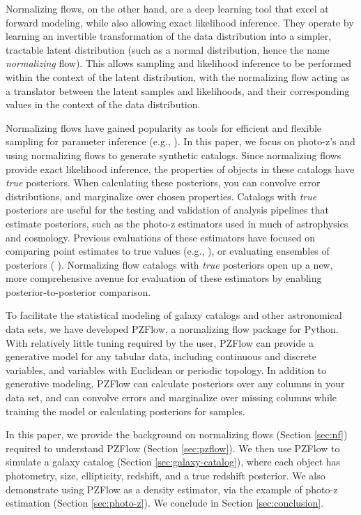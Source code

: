 \documentclass[twocolumn,twocolappendix]{aastex631}
\newcommand{\citePZp}{(\citetalias{schmidt2020} \citeyear{schmidt2020})\xspace}
\begin{document}
Normalizing flows, on the other hand, are a deep learning tool that excel at forward modeling, while also allowing exact likelihood inference.
They operate by learning an invertible transformation of the data distribution into a simpler, tractable latent distribution (such as a normal distribution, hence the name \emph{normalizing} flow).
This allows sampling and likelihood inference to be performed within the context of the latent distribution, with the normalizing flow acting as a translator between the latent samples and likelihoods, and their corresponding values in the context of the data distribution.

Normalizing flows have gained popularity as tools for efficient and flexible sampling for parameter inference (e.g., \citealt{dai2022,dacunha2022,hassan2022}).
In this paper, we focus on photo-z's and using normalizing flows to generate synthetic catalogs.
Since normalizing flows provide exact likelihood inference, the properties of objects in these catalogs have \emph{true} posteriors.
When calculating these posteriors, you can convolve error distributions, and marginalize over chosen properties.
Catalogs with \emph{true} posteriors are useful for the testing and validation of analysis pipelines that estimate posteriors, such as the photo-z estimators used in much of astrophysics and cosmology.
Previous evaluations of these estimators have focused on comparing point estimates to true values (e.g., \citealt{hildebrandt2010,sanchez2014,graham2018}), or evaluating ensembles of posteriors \citePZp.
Normalizing flow catalogs with \emph{true} posteriors open up a new, more comprehensive avenue for evaluation of these estimators by enabling posterior-to-posterior comparison.

To facilitate the statistical modeling of galaxy catalogs and other astronomical data sets, we have developed PZFlow, a normalizing flow package for Python.
With relatively little tuning required by the user, PZFlow can provide a generative model for any tabular data, including continuous and discrete variables, and variables with Euclidean or periodic topology.
In addition to generative modeling, PZFlow can calculate posteriors over any columns in your data set, and can convolve errors and marginalize over missing columns while training the model or calculating posteriors for samples.

In this paper, we provide the background on normalizing flows (Section \ref{sec:nf}) required to understand PZFlow (Section \ref{sec:pzflow}).
We then use PZFlow to simulate a galaxy catalog (Section \ref{sec:galaxy-catalog}), where each object has photometry, size, ellipticity, redshift, and a true redshift posterior.
We also demonstrate using PZFlow as a density estimator, via the example of photo-z estimation (Section \ref{sec:photo-z}).
We conclude in Section \ref{sec:conclusion}.
\end{document}
